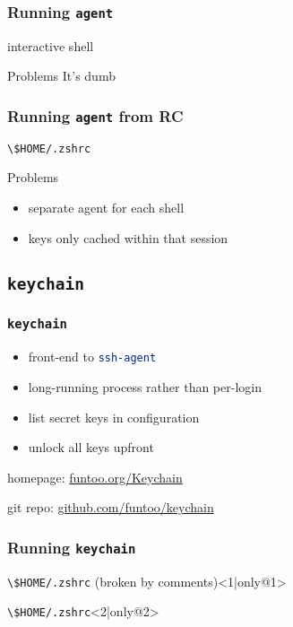 \documentclass[]{beamer}
\renewcommand{\sh}[1]{\lstinline[columns=fixed,language=sh]{#1}}
\begin{document}
\begin{frame}
  \frametitle{Running \sh{agent}}
  \begin{block}{interactive shell}
    
  \end{block}
  \begin{block}{Problems}\pause
    It's dumb
  \end{block}
\end{frame}

\begin{frame}
  \frametitle{Running \sh{agent} from RC}
  \begin{block}{\sh{\$HOME/.zshrc}}
    
  \end{block}
  \begin{block}{Problems}\pause
    \begin{itemize}
    \item
      separate agent for each shell
    \item
      keys only cached within that session
    \end{itemize}
  \end{block}
\end{frame}

\subsection{\sh{keychain}}
\begin{frame}
  \frametitle{\sh{keychain}} 
  \begin{itemize}
  \item
    front-end to \sh{ssh-agent}
  \item
    long-running process rather than per-login
  \item
    list secret keys in configuration
  \item
    unlock all keys upfront
  \end{itemize}
  \vspace{2em}
  
  homepage: \href{http://www.funtoo.org/Keychain}{funtoo.org/Keychain}
  
  git repo: \href{https://github.com/funtoo/keychain}{github.com/funtoo/keychain}
\end{frame}

\begin{frame}
  \frametitle{Running \sh{keychain}}
  \begin{block}{\sh{\$HOME/.zshrc} (broken by comments)}<1|only@1>
    
  \end{block}
  \begin{block}{\sh{\$HOME/.zshrc}}<2|only@2>
    
  \end{block}
\end{frame}
\end{document}
